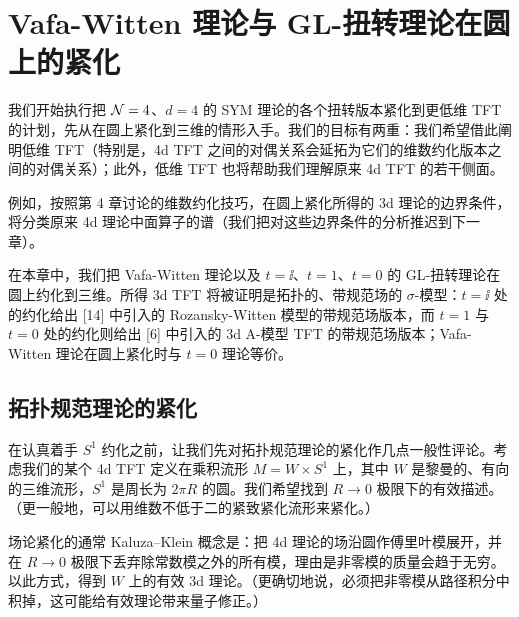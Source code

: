 
\chapter{Vafa-Witten 理论与 GL-扭转理论在圆上的紧化}

我们开始执行把 $\mathcal{N}=4$、$d=4$ 的 SYM 理论的各个扭转版本紧化到更低维 TFT 的计划，先从在圆上紧化到三维的情形入手。我们的目标有两重：我们希望借此阐明低维 TFT（特别是，4d TFT 之间的对偶关系会延拓为它们的维数约化版本之间的对偶关系）；此外，低维 TFT 也将帮助我们理解原来 4d TFT 的若干侧面。

例如，按照第 4 章讨论的维数约化技巧，在圆上紧化所得的 3d 理论的边界条件，将分类原来 4d 理论中面算子的谱（我们把对这些边界条件的分析推迟到下一章）。

在本章中，我们把 Vafa-Witten 理论以及 $t=\ii$、$t=1$、$t=0$ 的 GL-扭转理论在圆上约化到三维。所得 3d TFT 将被证明是拓扑的、带规范场的 $\sigma$-模型：$t=\ii$ 处的约化给出 [14] 中引入的 Rozansky-Witten 模型的带规范场版本，而 $t=1$ 与 $t=0$ 处的约化则给出 [6] 中引入的 3d A-模型 TFT 的带规范场版本；Vafa-Witten 理论在圆上紧化时与 $t=0$ 理论等价。

\section{拓扑规范理论的紧化}

在认真着手 $S^1$ 约化之前，让我们先对拓扑规范理论的紧化作几点一般性评论。考虑我们的某个 4d TFT 定义在乘积流形 $M=W\times S^1$ 上，其中 $W$ 是黎曼的、有向的三维流形，$S^1$ 是周长为 $2\pi R$ 的圆。我们希望找到 $R\to0$ 极限下的有效描述。（更一般地，可以用维数不低于二的紧致紧化流形来紧化。）

场论紧化的通常 Kaluza–Klein 概念是：把 4d 理论的场沿圆作傅里叶模展开，并在 $R\to0$ 极限下丢弃除常数模之外的所有模，理由是非零模的质量会趋于无穷。以此方式，得到 $W$ 上的有效 3d 理论。（更确切地说，必须把非零模从路径积分中积掉，这可能给有效理论带来量子修正。）


